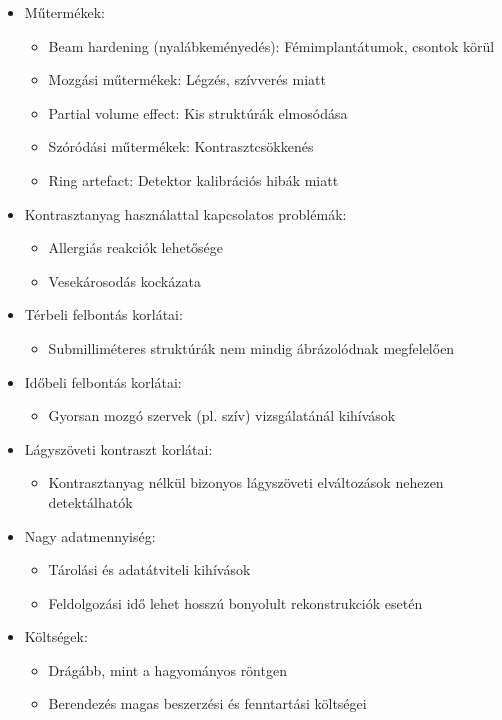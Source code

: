 \documentclass[a4paper,12pt]{article}
\begin{document}
\begin{itemize}
\item Műtermékek: \begin{itemize} \item Beam hardening (nyalábkeményedés): Fémimplantátumok, csontok körül \item Mozgási műtermékek: Légzés, szívverés miatt \item Partial volume effect: Kis struktúrák elmosódása \item Szóródási műtermékek: Kontrasztcsökkenés \item Ring artefact: Detektor kalibrációs hibák miatt \end{itemize} \item Kontrasztanyag használattal kapcsolatos problémák: \begin{itemize} \item Allergiás reakciók lehetősége \item Vesekárosodás kockázata \end{itemize} \item Térbeli felbontás korlátai: \begin{itemize} \item Submilliméteres struktúrák nem mindig ábrázolódnak megfelelően \end{itemize} \item Időbeli felbontás korlátai: \begin{itemize} \item Gyorsan mozgó szervek (pl. szív) vizsgálatánál kihívások \end{itemize} \item Lágyszöveti kontraszt korlátai: \begin{itemize} \item Kontrasztanyag nélkül bizonyos lágyszöveti elváltozások nehezen detektálhatók \end{itemize} \item Nagy adatmennyiség: \begin{itemize} \item Tárolási és adatátviteli kihívások \item Feldolgozási idő lehet hosszú bonyolult rekonstrukciók esetén \end{itemize} \item Költségek: \begin{itemize} \item Drágább, mint a hagyományos röntgen \item Berendezés magas beszerzési és fenntartási költségei \end{itemize}
\end{itemize}
\end{document}
